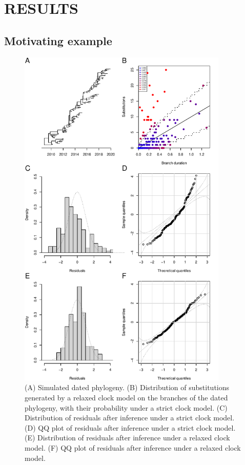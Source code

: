 \documentclass{article}
\begin{document}
\section*{RESULTS}

\subsection*{Motivating example}

\begin{figure}[p!]
\begin{center}
\includegraphics[width=10cm]{example.pdf}
\end{center}
\caption{(A) Simulated dated phylogeny. (B) Distribution of substitutions generated by a relaxed clock model
on the branches of the dated phylogeny, with their probability under a strict clock model. 
(C) Distribution of residuals after inference under a strict clock model. 
(D) QQ plot of residuals after inference under a strict clock model.
(E) Distribution of residuals after inference under a relaxed clock model. 
(F) QQ plot of residuals after inference under a relaxed clock model.
\label{fig:example}}
\end{figure}
\end{document}
